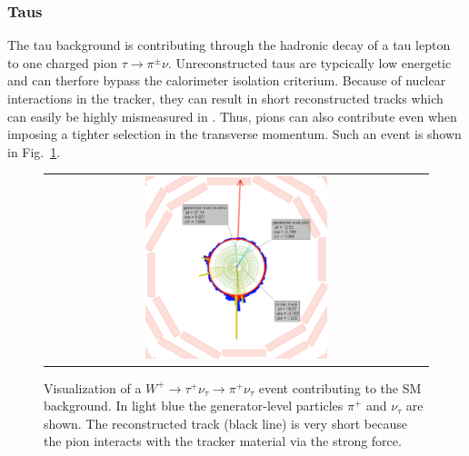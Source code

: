 \subsubsection*{Taus}
The tau background is contributing through the hadronic decay of a tau lepton to one charged pion $\tau\rightarrow\pi^{\pm}\nu$.
Unreconstructed taus are typcically low energetic and can therfore bypass the calorimeter isolation criterium.
Because of nuclear interactions in the tracker, they can result in short reconstructed tracks which can easily be highly mismeasured in \pt.
Thus, pions can also contribute even when imposing a tighter selection in the transverse momentum.
Such an event is shown in Fig.~\ref{fig:LostTau}.
\begin{figure}[!tb]
  \centering 
  \begin{tabular}{c}
    \includegraphics[width=0.49\textwidth]{figures/analysis/LostTau_Lumi_60133_Event_24033837.png}
  \end{tabular}
  \caption{Visualization of a $W^{+}\rightarrow \tau^{+}\nu_{\tau} \rightarrow \pi^{+} \nu_{\tau}$ event contributing to the SM background. 
           In light blue the generator-level particles $\pi^{+}$ and $\nu_{\tau}$ are shown.
           The reconstructed track (black line) is very short because the pion interacts with the tracker material via the strong force.}
  \label{fig:LostTau}
\end{figure}

